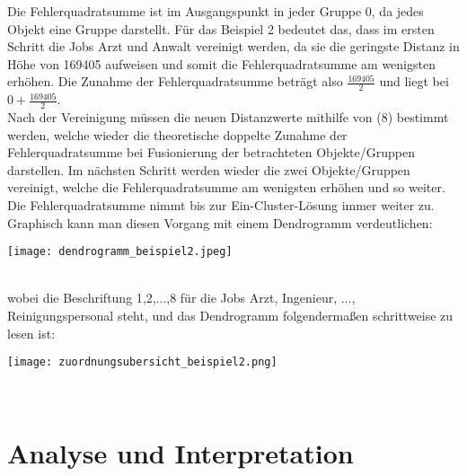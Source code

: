 \documentclass[12pt,titlepage]{article}
\begin{document}
Die Fehlerquadratsumme ist im Ausgangspunkt in jeder Gruppe 0, da jedes Objekt eine Gruppe darstellt. Für das Beispiel 2 bedeutet das, dass im ersten Schritt die Jobs Arzt und Anwalt vereinigt werden, da sie die geringste Distanz in Höhe von 169405 aufweisen und somit die Fehlerquadratsumme am wenigsten erhöhen. Die Zunahme der Fehlerquadratsumme beträgt also $\frac{169405}{2}$ und liegt bei $0+\frac{169405}{2}$. \\
Nach der Vereinigung müssen die neuen Distanzwerte mithilfe von (8) bestimmt werden, welche wieder die theoretische doppelte Zunahme der Fehlerquadratsumme bei Fusionierung der betrachteten Objekte/Gruppen darstellen. Im nächsten Schritt werden wieder die zwei Objekte/Gruppen vereinigt, welche die Fehlerquadratsumme am wenigsten erhöhen und so weiter. Die Fehlerquadratsumme nimmt bis zur Ein-Cluster-Lösung immer weiter zu.\\
Graphisch kann man diesen Vorgang mit einem Dendrogramm verdeutlichen: \\
\centerline{{\texttt{[image: dendrogramm\_beispiel2.jpeg]}}} \\
wobei die Beschriftung 1,2,...,8 für die Jobs Arzt, Ingenieur, ..., Reinigungspersonal steht, und das Dendrogramm folgendermaßen schrittweise zu lesen ist: \\
\centerline{{\texttt{[image: zuordnungsubersicht\_beispiel2.png]}}} \\






		


	\section{Analyse und Interpretation}
\end{document}
